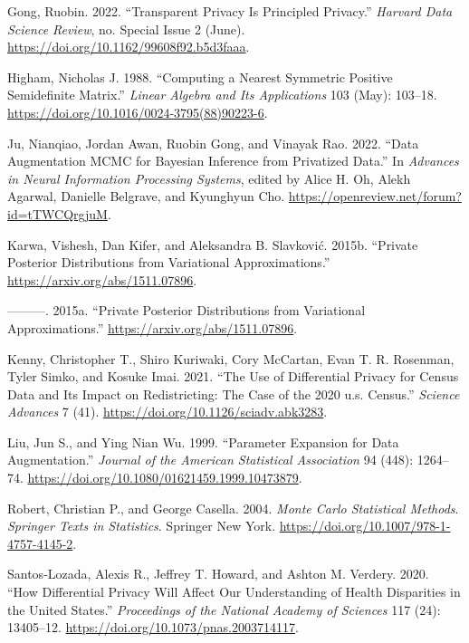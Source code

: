 \begin{CSLReferences}{1}{0}
\leavevmode{}%
Gong, Ruobin. 2022. {``Transparent Privacy Is Principled Privacy.''} \emph{Harvard Data Science Review}, no. Special Issue 2 (June). \url{https://doi.org/10.1162/99608f92.b5d3faaa}.

\leavevmode{}%
Higham, Nicholas J. 1988. {``Computing a Nearest Symmetric Positive Semidefinite Matrix.''} \emph{Linear Algebra and Its Applications} 103 (May): 103--18. \url{https://doi.org/10.1016/0024-3795(88)90223-6}.

\leavevmode{}%
Ju, Nianqiao, Jordan Awan, Ruobin Gong, and Vinayak Rao. 2022. {``Data Augmentation {MCMC} for Bayesian Inference from Privatized Data.''} In \emph{Advances in Neural Information Processing Systems}, edited by Alice H. Oh, Alekh Agarwal, Danielle Belgrave, and Kyunghyun Cho. \url{https://openreview.net/forum?id=tTWCQrgjuM}.

\leavevmode{}%
Karwa, Vishesh, Dan Kifer, and Aleksandra B. Slavković. 2015b. {``Private Posterior Distributions from Variational Approximations.''} \url{https://arxiv.org/abs/1511.07896}.

\leavevmode{}%
---------. 2015a. {``Private Posterior Distributions from Variational Approximations.''} \url{https://arxiv.org/abs/1511.07896}.

\leavevmode{}%
Kenny, Christopher T., Shiro Kuriwaki, Cory McCartan, Evan T. R. Rosenman, Tyler Simko, and Kosuke Imai. 2021. {``The Use of Differential Privacy for Census Data and Its Impact on Redistricting: The Case of the 2020 u.s. Census.''} \emph{Science Advances} 7 (41). \url{https://doi.org/10.1126/sciadv.abk3283}.

\leavevmode{}%
Liu, Jun S., and Ying Nian Wu. 1999. {``Parameter Expansion for Data Augmentation.''} \emph{Journal of the American Statistical Association} 94 (448): 1264--74. \url{https://doi.org/10.1080/01621459.1999.10473879}.

\leavevmode{}%
Robert, Christian P., and George Casella. 2004. \emph{Monte Carlo Statistical Methods}. \emph{Springer Texts in Statistics}. Springer New York. \url{https://doi.org/10.1007/978-1-4757-4145-2}.

\leavevmode{}%
Santos-Lozada, Alexis R., Jeffrey T. Howard, and Ashton M. Verdery. 2020. {``How Differential Privacy Will Affect Our Understanding of Health Disparities in the United States.''} \emph{Proceedings of the National Academy of Sciences} 117 (24): 13405--12. \url{https://doi.org/10.1073/pnas.2003714117}.


\end{CSLReferences}
